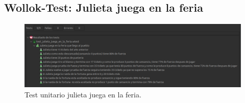 \documentclass[11pt,a4paper]{article}
\begin{document}
\subsection{Wollok-Test: Julieta juega en la feria}


\begin{figure}[H]
	\centering
	\includegraphics[scale=0.4]{figuras/test_julieta_juega_en_la_feria.png}
    \caption{Test unitario julieta juega en la feria.}
    \label{fig:test julieta juega en la feria}
\end{figure}  


\newpage

\appendix


%
%
\end{document}
